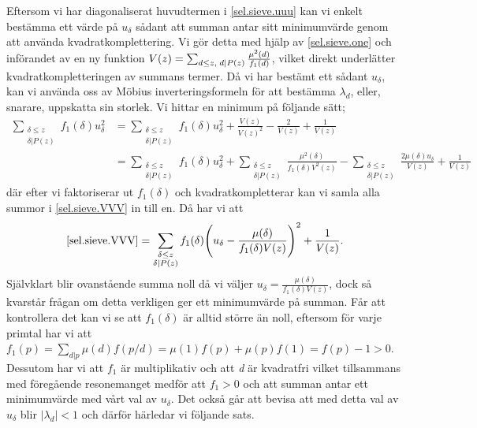 Eftersom vi har diagonaliserat huvudtermen i \eqref{sel.sieve.uuu} kan vi enkelt bestämma ett värde på \(u_\delta\) sådant att summan antar sitt minimumvärde genom att använda kvadratkomplettering. 
Vi gör detta med hjälp av \eqref{sel.sieve.one} och införandet av en ny funktion \(V(z) = \sum_{d\leq z,\; d\mid P(z)}\frac{\mu^2(d)}{f_1(d)}\), vilket direkt underlätter kvadratkompletteringen av summans termer.
Då vi har bestämt ett sådant \(u_\delta\), kan vi använda oss av Möbius inverteringsformeln för att bestämma \(\lambda_d\), eller, snarare, uppskatta sin storlek.
Vi hittar en minimum på följande sätt;
\begin{align}
    \sum_{\substack{\delta \leq z\\ \delta | P(z)}}f_1(\delta) u_\delta^2 &= \sum_{\substack{\delta\leq z\\\delta|P(z)}} f_1(\delta)u_\delta^2 + \frac{V(z)}{V(z)^2} - \frac{2}{V(z)} + \frac{1}{V(z)}\nonumber\\
    &= \sum_{\substack{\delta\leq z\\\delta|P(z)}} f_1(\delta)u_\delta^2 + \sum_{\substack{\delta\leq z\\ \delta|P(z)}}\frac{\mu^2(\delta)}{f_1(\delta)V^2(z)} - \sum_{\substack{\delta\leq z\\\delta |P(z)}}\frac{2\mu(\delta)u_\delta}{V(z)} + \frac{1}{V(z)}\label{sel.sieve.VVV}
\end{align}
där efter vi faktoriserar ut \(f_1(\delta)\) och kvadratkompletterar kan vi  samla alla summor i \eqref{sel.sieve.VVV} in till en. Då har vi att
\begin{equation}
    \eqref{sel.sieve.VVV} = \sum_{\substack{\delta\leq z\\\delta|P(z)}}f_1(\delta)\Bigg(u_\delta - \frac{\mu(\delta)}{f_1(\delta)V(z)}\Bigg)^2 + \frac{1}{V(z)}.\nonumber
\end{equation}
Självklart blir ovanstående summa noll då vi väljer \(u_\delta = \frac{\mu(\delta)}{f_1(\delta)V(z)}\), dock så kvarstår frågan om detta verkligen ger ett minimumvärde på summan. Får att kontrollera det kan vi se att \(f_1(\delta)\) är alltid större än noll, eftersom för varje primtal har vi att \(f_1(p) = \sum_{d|p}\mu(d)f({p}/{d}) = \mu(1)f(p) + \mu(p)f(1) = f(p) - 1 > 0\). 
Dessutom har vi att \(f_1\) är multiplikativ och att \textit{d} är kvadratfri vilket tillsammans med föregående resonemanget medför att \(f_1 > 0\) och att summan antar ett minimumvärde med vårt val av \(u_\delta\).
Det också går att bevisa att med detta val av \(u_\delta\) blir \(|\lambda_d| < 1\) \cite[s. 122-123]{cojocarumurty} och därför härledar vi följande sats.

